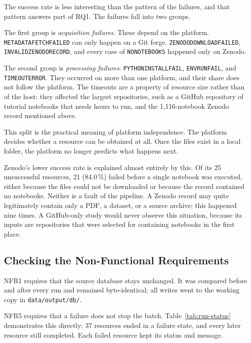 The success rate is less interesting than the pattern of the failures, and that pattern answers part of RQ1. The failures fall into two groups.

The first group is \emph{acquisition failures}. These depend on the platform. \texttt{METADATA\ub FETCH\ub FAILED} can only happen on a Git forge. \texttt{ZENODO\ub DOWNLOAD\ub FAILED}, \texttt{INVALID\ub ZENODO\ub RECORD}, and every case of \texttt{NO\ub NOTEBOOKS} happened only on Zenodo.

The second group is \emph{processing failures}: \texttt{PYTHON\ub INSTALL\ub FAIL}, \texttt{ENV\ub RUN\ub FAIL}, and \texttt{TIMEOUT\ub ERROR}. They occurred on more than one platform, and their share does not follow the platform. The timeouts are a property of resource size rather than of the host: they affected the largest repositories, such as a GitHub repository of tutorial notebooks that needs hours to run, and the 1{,}116-notebook Zenodo record mentioned above.

This split is the practical meaning of platform independence. The platform decides whether a resource can be obtained at all. Once the files exist in a local folder, the platform no longer predicts what happens next.

Zenodo's lower success rate is explained almost entirely by this. Of its 25 unsuccessful resources, 21 (84.0\,\%) failed before a single notebook was executed, either because the files could not be downloaded or because the record contained no notebooks. Neither is a fault of the pipeline. A Zenodo record may quite legitimately contain only a PDF, a dataset, or a source archive; this happened nine times. A GitHub-only study would never observe this situation, because its inputs are repositories that were selected for containing notebooks in the first place.

\subsection{Checking the Non-Functional Requirements}

NFR1 requires that the source database stays unchanged. It was compared before and after every run and remained byte-identical; all writes went to the working copy in \texttt{data/output/db/}.

NFR5 requires that a failure does not stop the batch. Table~\ref{tab:run-status} demonstrates this directly: 37 resources ended in a failure state, and every later resource still completed. Each failed resource kept its status and message.

